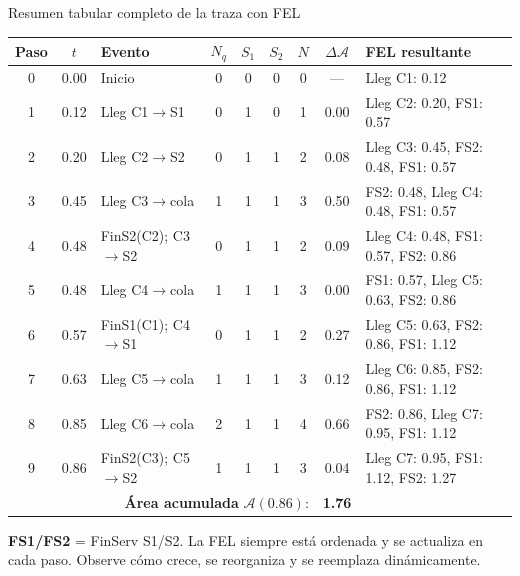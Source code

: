 \documentclass[aspectratio=1610, 9pt]{beamer}
\begin{document}
\begin{frame}{Resumen tabular completo de la traza con FEL}

\begin{center}
\renewcommand{\arraystretch}{1.1}
\scriptsize
\begin{tabular}{c c l c c c c c p{3.5cm}}
\toprule
\textbf{Paso} & $t$ & \textbf{Evento} & $N_q$ & $S_1$ & $S_2$ & $N$ & $\Delta\mathcal{A}$ & \textbf{FEL resultante} \\
\midrule
0 & 0.00 & Inicio & 0 & 0 & 0 & 0 & --- & Lleg C1: 0.12 \\
1 & 0.12 & Lleg C1$\to$S1 & 0 & 1 & 0 & 1 & 0.00 & Lleg C2: 0.20, FS1: 0.57 \\
2 & 0.20 & Lleg C2$\to$S2 & 0 & 1 & 1 & 2 & 0.08 & Lleg C3: 0.45, FS2: 0.48, FS1: 0.57 \\
3 & 0.45 & Lleg C3$\to$cola & 1 & 1 & 1 & 3 & 0.50 & FS2: 0.48, Lleg C4: 0.48, FS1: 0.57 \\
4 & 0.48 & FinS2(C2); C3$\to$S2 & 0 & 1 & 1 & 2 & 0.09 & Lleg C4: 0.48, FS1: 0.57, FS2: 0.86 \\
5 & 0.48 & Lleg C4$\to$cola & 1 & 1 & 1 & 3 & 0.00 & FS1: 0.57, Lleg C5: 0.63, FS2: 0.86 \\
6 & 0.57 & FinS1(C1); C4$\to$S1 & 0 & 1 & 1 & 2 & 0.27 & Lleg C5: 0.63, FS2: 0.86, FS1: 1.12 \\
7 & 0.63 & Lleg C5$\to$cola & 1 & 1 & 1 & 3 & 0.12 & Lleg C6: 0.85, FS2: 0.86, FS1: 1.12 \\
8 & 0.85 & Lleg C6$\to$cola & 2 & 1 & 1 & 4 & 0.66 & FS2: 0.86, Lleg C7: 0.95, FS1: 1.12 \\
9 & 0.86 & FinS2(C3); C5$\to$S2 & 1 & 1 & 1 & 3 & 0.04 & Lleg C7: 0.95, FS1: 1.12, FS2: 1.27 \\
\midrule
\multicolumn{7}{r}{\textbf{Área acumulada} $\mathcal{A}(0.86)$:} & \textbf{1.76} & \\
\bottomrule
\end{tabular}
\end{center}

\vspace{0.1cm}
\small \textbf{FS1/FS2} = FinServ S1/S2. La FEL siempre está ordenada y se actualiza en cada paso. Observe cómo crece, se reorganiza y se reemplaza dinámicamente.
\end{frame}
\end{document}
